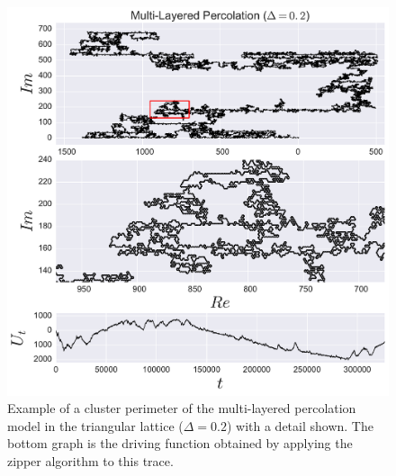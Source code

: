 \begin{figure}
\begin{center}
    \includegraphics[scale=0.5]{chapters/ch6-asle/figs/ml_trdr}
\end{center}
\caption{Example of a cluster perimeter of the multi-layered percolation model
    in the triangular lattice ($\Delta=0.2$) with a detail shown. The bottom
    graph is the driving function obtained by applying the zipper algorithm to
    this trace.}
\label{fig:ml_trdr}
\end{figure}

